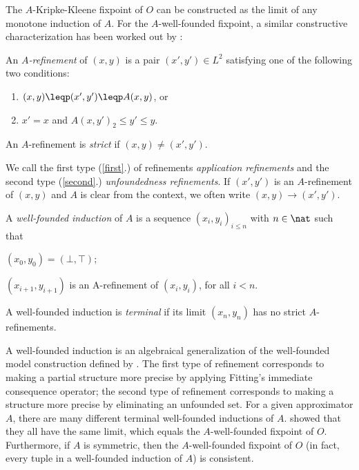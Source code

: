 The $A$-Kripke-Kleene fixpoint of $O$ can be constructed as the limit of any monotone induction of $A$. 
For the $A$-well-founded fixpoint, a similar constructive characterization has been worked out by \citet{lpnmr/DeneckerV07}:

\begin{definition}\label{002:def:refinement}
An \emph{$A$-refinement} of $(x,y)$ is a pair $(x',y')\in L^2$ satisfying one of the following two conditions:
\begin{enumerate}
	\item $(x,y)\leqp(x',y')\leqp A(x,y)$, or \label{first}
	\item $x'=x$ and  $A(x,y')_2\leq y'\leq y$. \label{second}
\end{enumerate}
An $A$-refinement is \emph{strict} if $(x,y)\neq (x',y')$.
\end{definition}

We call the first type (\ref{first}.) of refinements \emph{application refinements} and the second type (\ref{second}.) \emph{unfoundedness refinements}. If $(x',y')$ is an $A$-refinement of $(x,y)$ and $A$ is clear from the context, we often write $(x,y)\to(x',y')$.
%

 \begin{definition}
 A \emph{well-founded induction} of $A$  is a sequence 
$(x_i,y_i)_{i\leq n}$
with $n\in\nat$ such that 
\begin{compactitem}
	\item $(x_0,y_0) = (\bot,\top)$;
	\item $(x_{i+1},y_{i+1})$ is an A-refinement of $(x_{i},y_{i})$, for  all $i<n$.
\end{compactitem}
A well-founded induction is \emph{terminal} if its limit $(x_n,y_n)$ has no strict $A$-refinements.
\end{definition}
A well-founded induction is an algebraical generalization of the well-founded model construction defined by \citet{GelderRS91}. 
The first type of refinement corresponds to making a partial structure more precise by applying Fitting's immediate consequence operator; the second type of refinement corresponds to making a structure more precise by eliminating an unfounded set. 
For a given approximator $A$, there are many different terminal well-founded inductions of $A$.
\citet{lpnmr/DeneckerV07}  showed that they all have the same limit, which equals the $A$-well-founded fixpoint of $O$. Furthermore, if $A$ is symmetric, then the $A$-well-founded fixpoint of $O$ (in fact, every tuple in a well-founded induction of $A$) is consistent.

